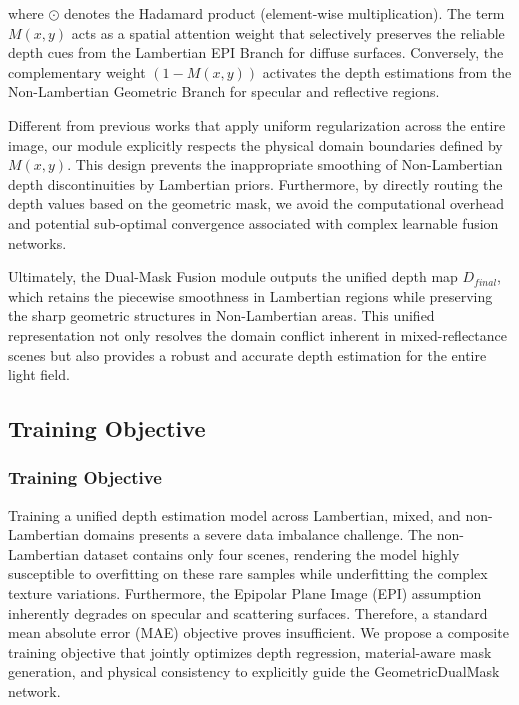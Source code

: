 where $\odot$ denotes the Hadamard product (element-wise multiplication). The term $M(x,y)$ acts as a spatial attention weight that selectively preserves the reliable depth cues from the Lambertian EPI Branch for diffuse surfaces. Conversely, the complementary weight $(1 - M(x,y))$ activates the depth estimations from the Non-Lambertian Geometric Branch for specular and reflective regions. 

Different from previous works that apply uniform regularization across the entire image, our module explicitly respects the physical domain boundaries defined by $M(x,y)$. This design prevents the inappropriate smoothing of Non-Lambertian depth discontinuities by Lambertian priors. Furthermore, by directly routing the depth values based on the geometric mask, we avoid the computational overhead and potential sub-optimal convergence associated with complex learnable fusion networks. 

Ultimately, the Dual-Mask Fusion module outputs the unified depth map $D_{final}$, which retains the piecewise smoothness in Lambertian regions while preserving the sharp geometric structures in Non-Lambertian areas. This unified representation not only resolves the domain conflict inherent in mixed-reflectance scenes but also provides a robust and accurate depth estimation for the entire light field.

\subsection{Training Objective}

\subsubsection{Training Objective}

Training a unified depth estimation model across Lambertian, mixed, and non-Lambertian domains presents a severe data imbalance challenge. The non-Lambertian dataset contains only four scenes, rendering the model highly susceptible to overfitting on these rare samples while underfitting the complex texture variations. Furthermore, the Epipolar Plane Image (EPI) assumption inherently degrades on specular and scattering surfaces. Therefore, a standard mean absolute error (MAE) objective proves insufficient. We propose a composite training objective that jointly optimizes depth regression, material-aware mask generation, and physical consistency to explicitly guide the GeometricDualMask network.

